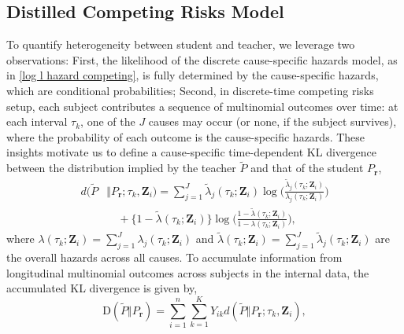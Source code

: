 \documentclass{article}
\theoremstyle{plain}
\theoremstyle{definition}
\theoremstyle{remark}
\begin{document}
\subsection{Distilled Competing Risks Model}
To quantify heterogeneity between student and teacher, we leverage two observations: 
First, the likelihood of the discrete cause-specific hazards model, as in \eqref{log l hazard competing}, is fully determined by the cause-specific hazards, which are conditional probabilities; 
Second, in discrete-time competing risks setup, each subject contributes a sequence of multinomial outcomes over time: at each interval $\tau_k$, one of the $J$ causes may occur (or none, if the subject survives), where the probability of each outcome is the cause-specific hazards.  These insights motivate us to define a cause-specific time-dependent  KL divergence between the  distribution implied by the teacher $\tilde{P}$ and that of the student $P_{\boldsymbol{r}}$,
\begin{align}
d(\tilde P &\Vert P_{\boldsymbol r}; \tau_k, \bm Z_i)
=
\sum_{j=1}^J
\tilde{\lambda}_j(\tau_k; \bm Z_i)
\log\!\Biggl(
\frac{\tilde{\lambda}_j(\tau_k; \bm Z_i)}
     {\lambda_j(\tau_k; \bm Z_i)}
\Biggr)
\nonumber\\
&\quad
+
\bigl\{1-\tilde{\lambda}(\tau_k; \bm Z_i)\bigr\}
\log\!\Biggl(
\frac{1-\tilde{\lambda}(\tau_k; \bm Z_i)}
     {1-\lambda(\tau_k; \bm Z_i)}
\Biggr),
\label{eq: kl}
\end{align}
where $\lambda(\tau_k; \bm{Z}_i) = \sum_{j=1}^J \lambda_j(\tau_k; \bm{Z}_i)$ and $\tilde{\lambda}(\tau_k;\bm{Z}_{i})= \sum_{j=1}^J \tilde\lambda_j(\tau_k; \bm{Z}_i)$ are the overall hazards across all causes. To accumulate information from longitudinal multinomial outcomes across subjects in the internal data,  the accumulated KL divergence is given by,
\begin{equation}
\mbox{D}(\tilde{P}\Vert P_{\boldsymbol{r}})=\sum_{i=1}^n \sum_{k=1}^K Y_{ik}d(\tilde{P}\Vert P_{\boldsymbol{r}};  \tau_k, \bm Z_i),
\label{eq: accumulative kl}
\end{equation}
\end{document}

